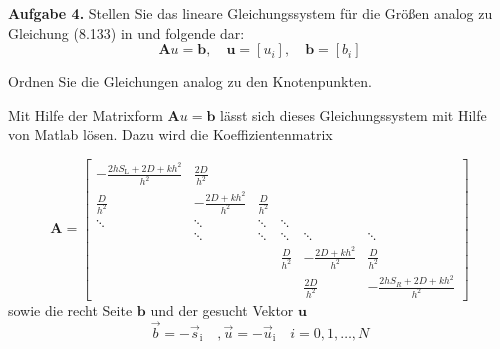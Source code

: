 \begin{mybox}
	\textbf{Aufgabe 4.} Stellen Sie das lineare Gleichungssystem für die Größen analog zu Gleichung (8.133) in \cite{Atkinson.2004} und folgende dar:
	\begin{equation}\label{eq:lgs}
		\mathbf{A} u = \mathbf{b},\quad \mathbf{u} = [u_i],\quad \mathbf{b} = [b_i]
	\end{equation}

	Ordnen Sie die Gleichungen analog zu den Knotenpunkten.
\end{mybox}




Mit Hilfe der Matrixform $\mathbf{A} u =\mathbf{ b} $ lässt sich dieses Gleichungssystem mit Hilfe von Matlab lösen. Dazu wird die Koeffizientenmatrix

\begin{equation}
\mathbf{A}=	\begin{bmatrix}
		-\frac{2hS_\mathrm{L}+2D+kh^2}{h^2} & \frac{2D}{h^2} & & &  &   \\
		\frac{D}{h^2} & - \frac{2D+kh^2}{h^2} & \frac{D}{h^2} &  &  & \\
	\ddots	&  \ddots &  \ddots &  \ddots &  &  \\
		& \ddots & \ddots & \ddots & \ddots  & \ddots \\
		&  &  & \frac{D}{h^2} & - \frac{2D+kh^2}{h^2} & \frac{D}{h^2} \\
		&  &  &  & \frac{2D}{h^2} & -\frac{2hS_R+2D+kh^2}{h^2}
	\end{bmatrix}
\end{equation}
sowie die recht Seite $\mathbf{b}$ und der gesucht Vektor $\mathbf{u}$
\begin{equation}
	\vec{b}=-\vec{s}_\mathrm{i}\quad,	\vec{u}=-\vec{u}_\mathrm{i} \quad i=0,1,\dots,N
\end{equation}

